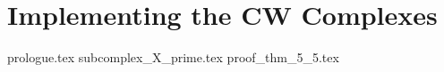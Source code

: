 \documentclass[class=article, crop=false]{standalone}
\begin{document}
\section{Implementing the CW Complexes}	

{prologue.tex}
{subcomplex_X_prime.tex}
{proof_thm_5_5.tex}
\end{document}
